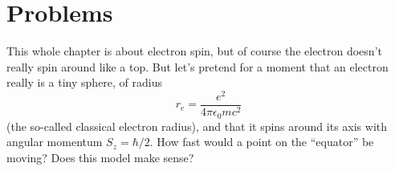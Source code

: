 %
%
%


\section*{Problems}
%

\begin{problem}
This whole chapter is about electron spin, but of course the electron doesn't really spin around like a top.  But let's pretend for a moment that an electron really is a tiny sphere, of radius
\[
r_e = \frac{e^2}{4\pi \epsilon_0 mc^2}
\]
(the so-called classical electron radius), and that it spins around its axis with angular momentum $S_z = \hbar/2$.  How fast would a point on the ``equator'' be moving?  Does this model make sense? 
\end{problem}

